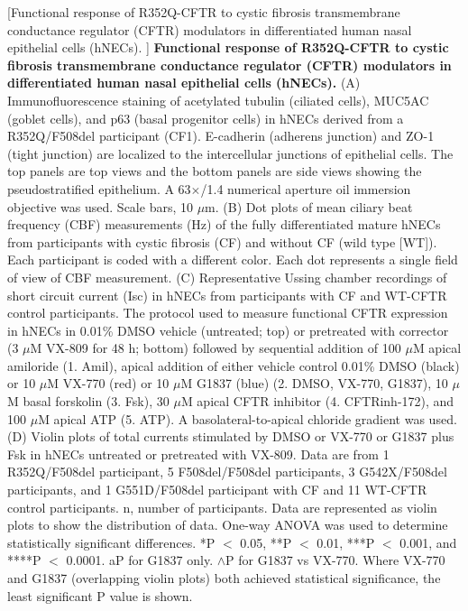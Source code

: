 	[Functional response of R352Q-CFTR to cystic fibrosis transmembrane conductance regulator (CFTR) modulators in differentiated human nasal epithelial cells (hNECs). ] {\textbf{Functional response of R352Q-CFTR to cystic fibrosis transmembrane conductance regulator (CFTR) modulators in differentiated human nasal epithelial cells (hNECs). }}{(A) Immunofluorescence staining of acetylated tubulin (ciliated cells), MUC5AC (goblet cells), and p63 (basal progenitor cells) in hNECs derived from a R352Q/F508del participant (CF1). E-cadherin (adherens junction) and ZO-1 (tight junction) are localized to the intercellular junctions of epithelial cells. The top panels are top views and the bottom panels are side views showing the pseudostratified epithelium. A 63$\times$/1.4 numerical aperture oil immersion objective was used. Scale bars, 10 $\mu$m. (B) Dot plots of mean ciliary beat frequency (CBF) measurements (Hz) of the fully differentiated mature hNECs from participants with cystic fibrosis (CF) and without CF (wild type [WT]). Each participant is coded with a different color. Each dot represents a single field of view of CBF measurement. (C) Representative Ussing chamber recordings of short circuit current (Isc) in hNECs from participants with CF and WT-CFTR control participants. The protocol used to measure functional CFTR expression in hNECs in 0.01\% DMSO vehicle (untreated; top) or pretreated with corrector (3 $\mu$M VX-809 for 48 h; bottom) followed by sequential addition of 100 $\mu$M apical amiloride (1. Amil), apical addition of either vehicle control 0.01\% DMSO (black) or 10 $\mu$M VX-770 (red) or 10 $\mu$M G1837 (blue) (2. DMSO, VX-770, G1837), 10 $\mu$M basal forskolin (3. Fsk), 30 $\mu$M apical CFTR inhibitor (4. CFTRinh-172), and 100 $\mu$M apical ATP (5. ATP). A basolateral-to-apical chloride gradient was used. (D) Violin plots of total currents stimulated by DMSO or VX-770 or G1837 plus Fsk in hNECs untreated or pretreated with VX-809. Data are from 1 R352Q/F508del participant, 5 F508del/F508del participants, 3 G542X/F508del participants, and 1 G551D/F508del participant with CF and 11 WT-CFTR control participants. n, number of participants. Data are represented as violin plots to show the distribution of data. One-way ANOVA was used to determine statistically significant differences. *P $<$ 0.05, **P $<$ 0.01, ***P $<$ 0.001, and ****P $<$ 0.0001. aP for G1837 only. $\wedge$P for G1837 vs VX-770. Where VX-770 and G1837 (overlapping violin plots) both achieved statistical significance, the least significant P value is shown.}
	\label{R352Q_figure_1}
	\endgroup


